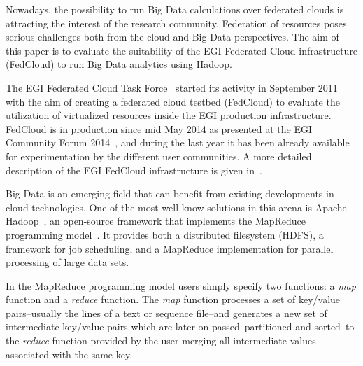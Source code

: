 

Nowadays, the possibility to run Big Data calculations over federated clouds is attracting the interest of the research community. Federation of resources poses serious challenges both from the cloud and Big Data perspectives. The aim of this paper is to evaluate the suitability of the EGI Federated Cloud infrastructure (FedCloud) to run Big Data analytics using Hadoop. 

The EGI Federated Cloud Task Force~\cite{fedcloudtaskforce} started its activity in September 2011 with the aim of creating a federated cloud testbed (FedCloud) to evaluate the utilization of virtualized resources inside the EGI production infrastructure. 
FedCloud is in production since mid May 2014 as presented at the EGI Community Forum 2014~\cite{fedcloud}, and during the last year it has been already available for experimentation by the different user communities. A more detailed description of the EGI FedCloud infrastructure is given in~\cite{fedcloudpaper}.

%

Big Data is an emerging field that can benefit from existing developments in cloud technologies. One of the  most well-know solutions in this arena is Apache Hadoop~\cite{hadoop}, an open-source framework that implements the MapReduce programming model~\cite{mapreduce}. It provides both a distributed filesystem (HDFS), a framework for job scheduling, and a MapReduce implementation for parallel processing of large data sets. 

In the MapReduce programming model users simply specify two functions: a \emph{map} function and a \emph{reduce} function. The \emph{map} function processes a set of key/value pairs--usually the lines of a text or sequence file--and generates a new set of intermediate key/value pairs which are later on passed--partitioned and sorted--to the \emph{reduce} function provided by the user merging all intermediate values associated with the same key.

